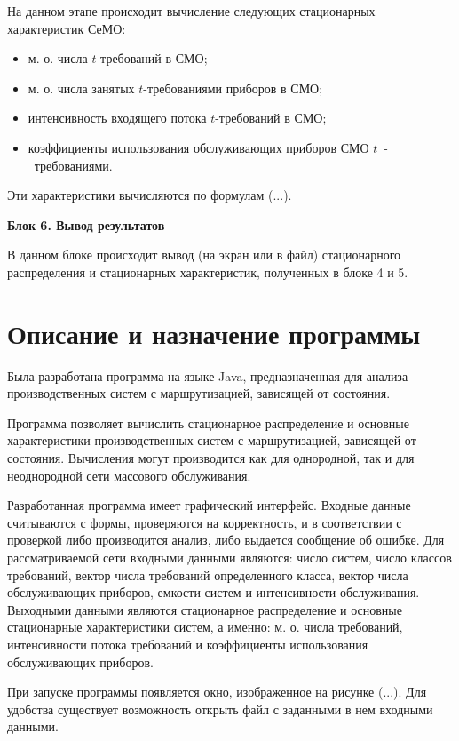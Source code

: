 \documentclass[a4paper,14pt]{extarticle}
\theoremstyle{note}
\begin{document}
На данном этапе происходит вычисление следующих стационарных характеристик СеМО:
\begin{itemize}
\item м. о. числа $t$-требований в СМО;
\item м. о. числа занятых $t$-требованиями приборов в СМО;
\item интенсивность входящего потока $t$-требований в СМО;
\item коэффициенты использования обслуживающих приборов СМО $t$~-~требованиями.
\end{itemize}
Эти характеристики вычисляются по формулам (...).

\medskip
\textbf{Блок 6. Вывод результатов}

В данном блоке происходит вывод (на экран или в файл) стационарного распределения и стационарных характеристик, полученных в блоке 4 и 5.




\section{Описание и назначение программы}
\label{sec:program_description_and_purpose}

Была разработана программа на языке Java, предназначенная для анализа производственных систем с маршрутизацией, зависящей от состояния.

Программа позволяет вычислить стационарное распределение и основные характеристики производственных систем с маршрутизацией, зависящей от состояния. Вычисления могут производится как для однородной, так и для неоднородной сети массового обслуживания.

Разработанная программа имеет графический интерфейс. Входные данные считываются с формы, проверяются на корректность, и в соответствии с проверкой либо производится анализ, либо выдается сообщение об ошибке. Для рассматриваемой сети входными данными являются: число систем, число классов требований, вектор числа требований определенного класса, вектор числа обслуживающих приборов, емкости систем и интенсивности обслуживания. Выходными данными являются стационарное распределение и основные стационарные характеристики систем, а именно: м. о. числа требований, интенсивности потока требований и коэффициенты использования обслуживающих приборов.

При запуске программы появляется окно, изображенное на рисунке (...). Для удобства существует возможность открыть файл с заданными в нем входными данными.
\end{document}
